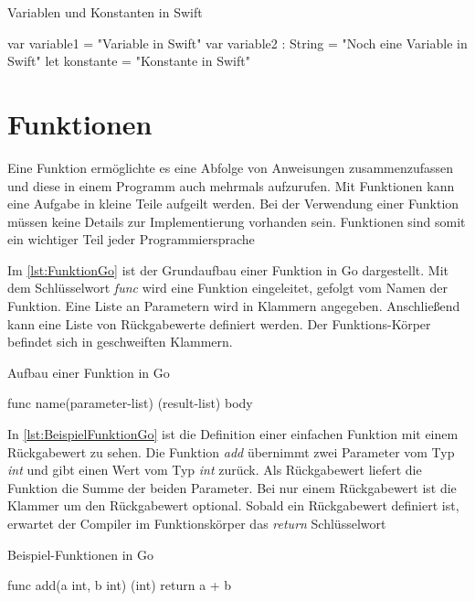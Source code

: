 \begin{listing}
\caption{Variablen und Konstanten in Swift}
\label{lst:VariableSwift}
\begin{SwiftCode}
var variable1 = "Variable in Swift"
var variable2 : String = "Noch eine Variable in Swift"
let konstante = "Konstante in Swift"
\end{SwiftCode}
\end{listing}

\section{Funktionen}
Eine Funktion ermöglichte es eine Abfolge von Anweisungen zusammenzufassen und diese in einem Programm auch mehrmals aufzurufen. 
Mit Funktionen kann eine Aufgabe in kleine Teile aufgeilt werden.
Bei der Verwendung einer Funktion müssen keine Details zur Implementierung vorhanden sein.
Funktionen sind somit ein wichtiger Teil jeder Programmiersprache \cite{Kennedy.2016}

Im \autoref{lst:FunktionGo} ist der Grundaufbau einer Funktion in Go dargestellt.
Mit dem Schlüsselwort \emph{func} wird eine Funktion eingeleitet, gefolgt vom Namen der Funktion.
Eine Liste an Parametern wird in Klammern angegeben. 
Anschließend kann eine Liste von Rückgabewerte definiert werden.
Der Funktions-Körper befindet sich in geschweiften Klammern.

\begin{listing}
\caption{Aufbau einer Funktion in Go \cite{Donovan.2016}}
\label{lst:FunktionGo}
\begin{GoCode}
func name(parameter-list) (result-list){
    body
}
\end{GoCode}
\end{listing}

In \autoref{lst:BeispielFunktionGo} ist die Definition einer einfachen Funktion mit einem Rückgabewert zu sehen. 
Die Funktion \emph{add} übernimmt zwei Parameter vom Typ \emph{int} und gibt einen Wert vom Typ \emph{int} zurück.
Als Rückgabewert liefert die Funktion die Summe der beiden Parameter.
Bei nur einem Rückgabewert ist die Klammer um den Rückgabewert optional.
Sobald ein Rückgabewert definiert ist, erwartet der Compiler im Funktionskörper das \emph{return} Schlüsselwort

\begin{listing}
\caption{Beispiel-Funktionen in Go}
\label{lst:BeispielFunktionGo}
\begin{GoCode}
func add(a int, b int) (int) {
    return a + b
}
\end{GoCode}
\end{listing}

